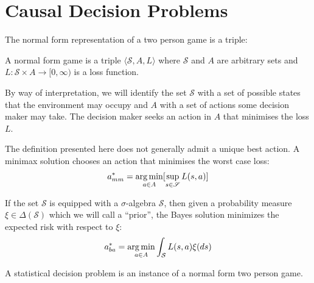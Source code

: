 \section{Causal Decision Problems}

The normal form representation of a two person game is a triple:

\begin{definition}
A normal form game is a triple $\langle \mathscr{S}, A, L\rangle$ where $\mathscr{S}$ and $A$ are arbitrary sets and $L:\mathscr{S}\times A\to [0,\infty)$ is a loss function.

By way of interpretation, we will identify the set $\mathscr{S}$ with a set of possible states that the environment may occupy and $A$ with a set of actions some decision maker may take. The decision maker seeks an action in $A$ that minimises the loss $L$.
\end{definition}

The definition presented here does not generally admit a unique best action. A minimax solution chooses an action that minimises the worst case loss:
\begin{align}
    a^*_{mm} = \operatorname*{arg\,min}_{a\in A} [\sup_{s\in \mathscr{S}} L(s,a)]\label{eq:mm_soln}
\end{align}

If the set $\mathscr{S}$ is equipped with a $\sigma$-algebra $\mathcal{S}$, then given a probability measure $\xi\in \Delta(\mathcal{S})$ which we will call a ``prior'', the Bayes solution minimizes the expected risk with respect to $\xi$:
\begin{align}
    a^*_{ba} = \operatorname*{arg\,min}_{a\in A} \int_{\mathcal{S}} L(s,a) \xi(ds) \label{eq:ba_soln}
\end{align}

A statistical decision problem is an instance of a normal form two person game.

